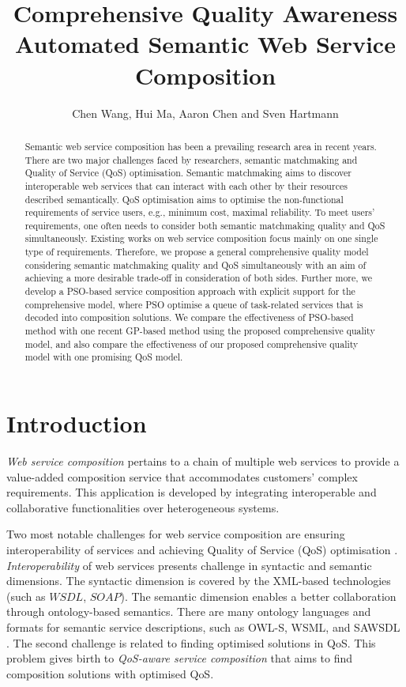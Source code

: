 \documentclass{llncs}
\title{Comprehensive Quality Awareness Automated Semantic Web Service Composition}
\author{Chen Wang, Hui Ma, Aaron Chen and Sven Hartmann}
\institute{School of Engineering and Computer Science,
\\Victoria University of Wellington, New Zealand \\
Email: \{chen.wang, hui.ma, aaron.chen\}@ecs.vuw.ac.nz}
\begin{document}
\maketitle
\begin{abstract}
Semantic web service composition has been a prevailing research area in recent years. There are two major challenges faced by researchers, semantic matchmaking and Quality of Service (QoS) optimisation. Semantic matchmaking aims to discover interoperable web services that can interact with each other by their resources described semantically. QoS optimisation aims to optimise the non-functional requirements of service users, e.g., minimum cost, maximal reliability. To meet users' requirements, one often needs to consider both semantic matchmaking quality and QoS simultaneously. Existing works on web service composition focus mainly on one single type of requirements. Therefore, we propose a general comprehensive quality model considering semantic matchmaking quality and QoS simultaneously with an aim of achieving a more desirable trade-off in consideration of both sides. Further more, we develop a PSO-based service composition approach with explicit support for the comprehensive model, where PSO optimise a queue of task-related services that is decoded into composition solutions. We compare the effectiveness of PSO-based method with one recent GP-based method using the proposed comprehensive quality model, and also compare the effectiveness of our proposed comprehensive quality model with one promising QoS model.

\end{abstract}
\section{Introduction}\label{introduction}

\textit{Web service composition} pertains to a chain of multiple web services to provide a value-added composition service that accommodates customers' complex requirements. This application is developed by integrating interoperable and collaborative functionalities over heterogeneous systems. 

Two most notable challenges for web service composition are ensuring interoperability of services and achieving Quality of Service (QoS) optimisation \cite{fensel2011semantic}. \textit{Interoperability} of web services presents challenge in syntactic and semantic dimensions. The syntactic dimension is covered by the XML-based technologies (such as $WSDL$, $SOAP$). The semantic dimension enables a better collaboration through ontology-based semantics. There are many ontology languages and formats for semantic service descriptions, such as OWL-S, WSML, and SAWSDL \cite{petrie2016web}. The second challenge is related to finding optimised solutions in QoS. This problem gives birth to \textit{QoS-aware service composition} that aims to find composition solutions with optimised QoS.
\end{document}
